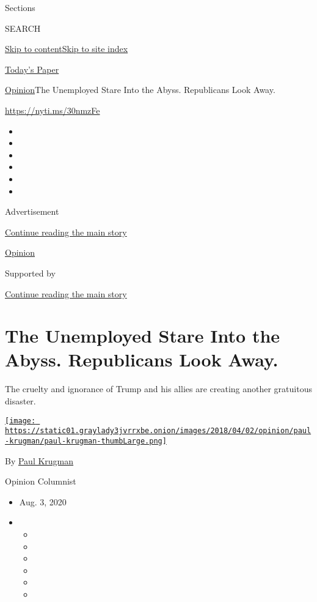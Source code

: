 Sections

SEARCH

\protect\hyperlink{site-content}{Skip to
content}\protect\hyperlink{site-index}{Skip to site index}

\href{https://myaccount.nytimes3xbfgragh.onion/auth/login?response_type=cookie\&client_id=vi}{}

\href{https://www.nytimes3xbfgragh.onion/section/todayspaper}{Today's
Paper}

\href{/section/opinion}{Opinion}\textbar{}The Unemployed Stare Into the
Abyss. Republicans Look Away.

\href{https://nyti.ms/30nmzFe}{https://nyti.ms/30nmzFe}

\begin{itemize}
\item
\item
\item
\item
\item
\item
\end{itemize}

Advertisement

\protect\hyperlink{after-top}{Continue reading the main story}

\href{/section/opinion}{Opinion}

Supported by

\protect\hyperlink{after-sponsor}{Continue reading the main story}

\hypertarget{the-unemployed-stare-into-the-abyss-republicans-look-away}{%
\section{The Unemployed Stare Into the Abyss. Republicans Look
Away.}\label{the-unemployed-stare-into-the-abyss-republicans-look-away}}

The cruelty and ignorance of Trump and his allies are creating another
gratuitous disaster.

\href{https://www.nytimes3xbfgragh.onion/by/paul-krugman}{\texttt{[image: https://static01.graylady3jvrrxbe.onion/images/2018/04/02/opinion/paul-krugman/paul-krugman-thumbLarge.png]}}

By \href{https://www.nytimes3xbfgragh.onion/by/paul-krugman}{Paul
Krugman}

Opinion Columnist

\begin{itemize}
\item
  Aug. 3, 2020
\item
  \begin{itemize}
  \item
  \item
  \item
  \item
  \item
  \item
  \end{itemize}
\end{itemize}

